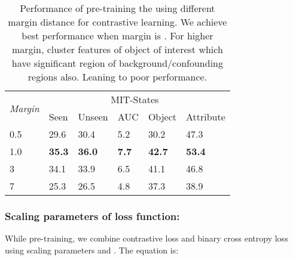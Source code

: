 \documentclass{bmvc2k}
\newcommand{\tablelightgray}{\rowcolor[gray]{.95}}
\begin{document}
\begin{table}[h]
\centering
\begin{tabular}{l|lllll}

\multirow{2}{*}{\textit{Margin}} & \multicolumn{5}{c}{MIT-States~\cite{isola2015discovering}}                                                                                                                                  \\ 
                                 & \multicolumn{1}{l|}{Seen}          & \multicolumn{1}{l|}{Unseen}        & \multicolumn{1}{l|}{AUC}          & \multicolumn{1}{l|}{Object}        & Attribute     \\ \hline
\tablelightgray
0.5                              & \multicolumn{1}{l|}{29.6}          & \multicolumn{1}{l|}{30.4}          & \multicolumn{1}{l|}{5.2}          & \multicolumn{1}{l|}{30.2}          & 47.3          \\ 
1.0                              & \multicolumn{1}{l|}{\textbf{35.3}} & \multicolumn{1}{l|}{\textbf{36.0}} & \multicolumn{1}{l|}{\textbf{7.7}} & \multicolumn{1}{l|}{\textbf{42.7}} & \textbf{53.4} \\ 
\tablelightgray
3                                & \multicolumn{1}{l|}{34.1}          & \multicolumn{1}{l|}{33.9}          & \multicolumn{1}{l|}{6.5}          & \multicolumn{1}{l|}{41.1}          & 46.8          \\ 
7                                & \multicolumn{1}{l|}{25.3}          & \multicolumn{1}{l|}{26.5}          & \multicolumn{1}{l|}{4.8}          & \multicolumn{1}{l|}{37.3}          & 38.9          \\ 
\end{tabular}
\vspace{0.1cm}
\caption{Performance of pre-training the  using different margin distance for contrastive learning. We achieve best performance when margin is . For higher margin,  cluster features of object of interest which have significant region of background/confounding regions also. Leaning to poor performance.}
\label{tab:margin}
\vspace{-0.4cm}
\end{table}

\subsubsection{Scaling parameters of loss function:} While pre-training, we combine contrastive loss and binary cross entropy loss using scaling parameters  and . The equation is:
\end{document}
